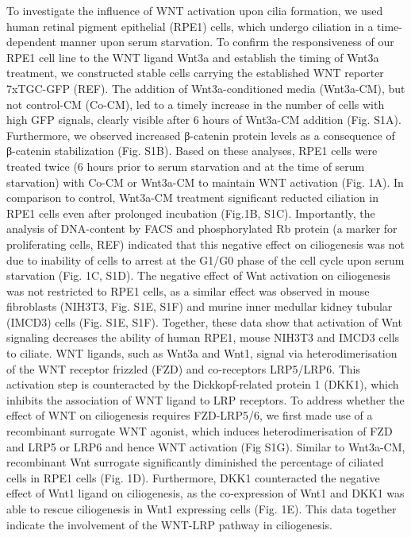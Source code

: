 \documentclass[
  11pt,
]{article}
\begin{document}
To investigate the influence of WNT activation upon cilia formation, we
used human retinal pigment epithelial (RPE1) cells, which undergo
ciliation in a time-dependent manner upon serum starvation. To confirm
the responsiveness of our RPE1 cell line to the WNT ligand Wnt3a and
establish the timing of Wnt3a treatment, we constructed stable cells
carrying the established WNT reporter 7xTGC-GFP (REF). The addition of
Wnt3a-conditioned media (Wnt3a-CM), but not control-CM (Co-CM), led to a
timely increase in the number of cells with high GFP signals, clearly
visible after 6 hours of Wnt3a-CM addition (Fig. S1A). Furthermore, we
observed increased β-catenin protein levels as a consequence of
β-catenin stabilization (Fig. S1B). Based on these analyses, RPE1 cells
were treated twice (6 hours prior to serum starvation and at the time of
serum starvation) with Co-CM or Wnt3a-CM to maintain WNT activation
(Fig. 1A). In comparison to control, Wnt3a-CM treatment significant
reducted ciliation in RPE1 cells even after prolonged incubation
(Fig.1B, S1C). Importantly, the analysis of DNA-content by FACS and
phosphorylated Rb protein (a marker for proliferating cells, REF)
indicated that this negative effect on ciliogenesis was not due to
inability of cells to arrest at the G1/G0 phase of the cell cycle upon
serum starvation (Fig. 1C, S1D). The negative effect of Wnt activation
on ciliogenesis was not restricted to RPE1 cells, as a similar effect
was observed in mouse fibroblasts (NIH3T3, Fig. S1E, S1F) and murine
inner medullar kidney tubular (IMCD3) cells (Fig. S1E, S1F). Together,
these data show that activation of Wnt signaling decreases the ability
of human RPE1, mouse NIH3T3 and IMCD3 cells to ciliate. WNT ligands,
such as Wnt3a and Wnt1, signal via heterodimerisation of the WNT
receptor frizzled (FZD) and co-receptors LRP5/LRP6. This activation step
is counteracted by the Dickkopf-related protein 1 (DKK1), which inhibits
the association of WNT ligand to LRP receptors. To address whether the
effect of WNT on ciliogenesis requires FZD-LRP5/6, we first made use of
a recombinant surrogate WNT agonist, which induces heterodimerisation of
FZD and LRP5 or LRP6 and hence WNT activation (Fig S1G). Similar to
Wnt3a-CM, recombinant Wnt surrogate significantly diminished the
percentage of ciliated cells in RPE1 cells (Fig. 1D). Furthermore, DKK1
counteracted the negative effect of Wnt1 ligand on ciliogenesis, as the
co-expression of Wnt1 and DKK1 was able to rescue ciliogenesis in Wnt1
expressing cells (Fig. 1E). This data together indicate the involvement
of the WNT-LRP pathway in ciliogenesis.
\end{document}
